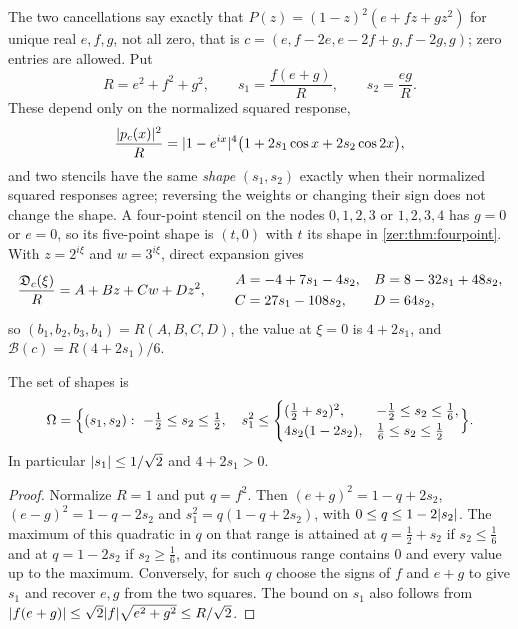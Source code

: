 The two cancellations say exactly that $P(z)=(1-z)^2(e+fz+gz^2)$ for unique real $e,f,g$, not all zero, that
is $c=(e,f-2e,e-2f+g,f-2g,g)$; zero entries are allowed. Put
\[
 R=e^2+f^2+g^2,\qquad s_1=\frac{f(e+g)}R,\qquad s_2=\frac{eg}R .
\]
These depend only on the normalized squared response,
\begin{equation}\label{flu:eq:fiveresponse}
 \frac{\lvert p_c(x)\rvert^2}R=\lvert1-e^{ix}\rvert^4\bigl(1+2s_1\cos x+2s_2\cos2x\bigr),
\end{equation}
and two stencils have the same \emph{shape} $(s_1,s_2)$ exactly when their normalized squared responses
agree; reversing the weights or changing their sign does not change the shape. A four-point stencil on
the nodes $0,1,2,3$ or $1,2,3,4$ has $g=0$ or $e=0$, so its five-point shape is $(t,0)$ with $t$ its shape in
\cref{zer:thm:fourpoint}. With $z=2^{i\xi}$ and $w=3^{i\xi}$, direct expansion gives
\begin{equation}\label{flu:eq:fivesymbol}
 \frac{\mathfrak{D}_c(\xi)}R=A+Bz+Cw+Dz^2,\qquad
 \begin{aligned}
 A&=-4+7s_1-4s_2,& B&=8-32s_1+48s_2,\\
 C&=27s_1-108s_2,& D&=64s_2,
 \end{aligned}
\end{equation}
so $(b_1,b_2,b_3,b_4)=R(A,B,C,D)$, the value at $\xi=0$ is $4+2s_1$, and $\mathcal B(c)=R(4+2s_1)/6$.

\begin{lemma}\label{flu:lem:fivedomain}
The set of shapes is
\[
 \Omega=\Bigl\{(s_1,s_2):\ -\tfrac12\le s_2\le\tfrac12,\quad
 s_1^2\le\begin{cases}(\tfrac12+s_2)^2,&-\tfrac12\le s_2\le\tfrac16,\\ 4s_2(1-2s_2),&\tfrac16\le s_2\le\tfrac12\end{cases}\Bigr\}.
\]
In particular $\lvert s_1\rvert\le1/\sqrt2$ and $4+2s_1>0$.
\end{lemma}
\begin{proof}
Normalize $R=1$ and put $q=f^2$. Then $(e+g)^2=1-q+2s_2$, $(e-g)^2=1-q-2s_2$ and $s_1^2=q(1-q+2s_2)$, with
$0\le q\le1-2\lvert s_2\rvert$. The maximum of this quadratic in $q$ on that range is attained at $q=\tfrac12+s_2$ if
$s_2\le\tfrac16$ and at $q=1-2s_2$ if $s_2\ge\tfrac16$, and its continuous range contains $0$ and every value up to
the maximum. Conversely, for such $q$ choose the signs of $f$ and $e+g$ to give $s_1$ and recover $e,g$ from the
two squares. The bound on $s_1$ also follows from $\lvert f(e+g)\rvert\le\sqrt2\lvert f\rvert\sqrt{e^2+g^2}\le R/\sqrt2$.
\end{proof}

